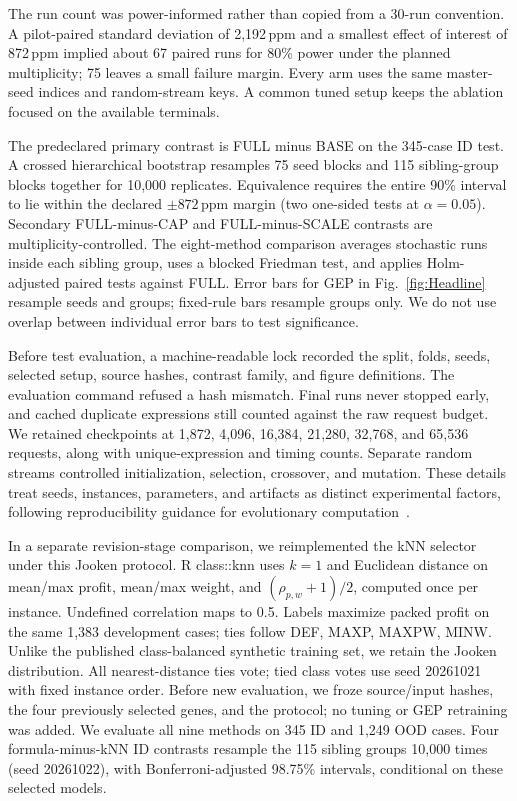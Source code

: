 \documentclass[conference]{IEEEtran}
\newcommand{\ppm}{\,\mathrm{ppm}}
\begin{document}
The run count was power-informed rather than copied from a 30-run convention. A pilot-paired standard deviation of 2,192$\ppm$ and a smallest effect of interest of 872$\ppm$ implied about 67 paired runs for 80\% power under the planned multiplicity; 75 leaves a small failure margin. Every arm uses the same master-seed indices and random-stream keys. A common tuned setup keeps the ablation focused on the available terminals.

The predeclared primary contrast is FULL minus BASE on the 345-case ID test. A crossed hierarchical bootstrap resamples 75 seed blocks and 115 sibling-group blocks together for 10,000 replicates. Equivalence requires the entire 90\% interval to lie within the declared $\pm872\ppm$ margin (two one-sided tests at $\alpha=0.05$). Secondary FULL-minus-CAP and FULL-minus-SCALE contrasts are multiplicity-controlled. The eight-method comparison averages stochastic runs inside each sibling group, uses a blocked Friedman test, and applies Holm-adjusted paired tests against FULL. Error bars for GEP in Fig.~\ref{fig:Headline} resample seeds and groups; fixed-rule bars resample groups only. We do not use overlap between individual error bars to test significance.

Before test evaluation, a machine-readable lock recorded the split, folds, seeds, selected setup, source hashes, contrast family, and figure definitions. The evaluation command refused a hash mismatch. Final runs never stopped early, and cached duplicate expressions still counted against the raw request budget. We retained checkpoints at 1,872, 4,096, 16,384, 21,280, 32,768, and 65,536 requests, along with unique-expression and timing counts. Separate random streams controlled initialization, selection, crossover, and mutation. These details treat seeds, instances, parameters, and artifacts as distinct experimental factors, following reproducibility guidance for evolutionary computation~\cite{repro2021}.


In a separate revision-stage comparison, we reimplemented the kNN selector~\cite{zarate2025} under this Jooken protocol. R class::knn uses $k=1$ and Euclidean distance on mean/max profit, mean/max weight, and $(\rho_{p,w}+1)/2$, computed once per instance. Undefined correlation maps to 0.5. Labels maximize packed profit on the same 1,383 development cases; ties follow DEF, MAXP, MAXPW, MINW. Unlike the published class-balanced synthetic training set, we retain the Jooken distribution. All nearest-distance ties vote; tied class votes use seed 20261021 with fixed instance order. Before new evaluation, we froze source/input hashes, the four previously selected genes, and the protocol; no tuning or GEP retraining was added. We evaluate all nine methods on 345 ID and 1,249 OOD cases. Four formula-minus-kNN ID contrasts resample the 115 sibling groups 10,000 times (seed 20261022), with Bonferroni-adjusted 98.75\% intervals, conditional on these selected models.
\end{document}
